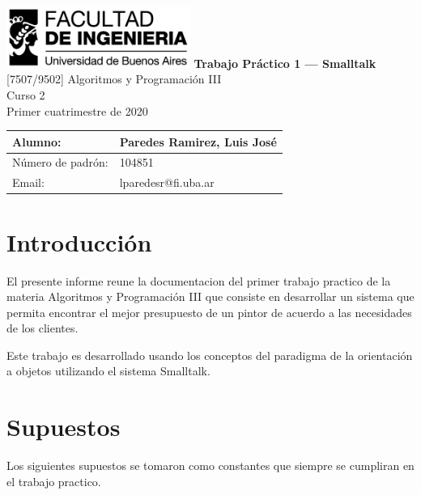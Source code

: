 \documentclass[titlepage,a4paper]{article}
\begin{document}
\begin{titlepage} %
	\hfill\includegraphics[width=6cm]{logofiuba.jpg}
    \centering
    \vfill
    \Huge \textbf{Trabajo Práctico 1 — Smalltalk}
    \vskip2cm
    \Large [7507/9502] Algoritmos y Programación III\\
    Curso 2 \\ %
    Primer cuatrimestre de 2020 
    \vfill
    \begin{tabular}{ | l | l | } %
      \hline
      Alumno: & Paredes Ramirez, Luis José\\ \hline
      Número de padrón: & 104851 \\ \hline
      Email: & lparedesr@fi.uba.ar \\ \hline
  	\end{tabular}
    \vfill
    \vfill
\end{titlepage}

\tableofcontents %
\newpage

\section{Introducción}\label{sec:intro}
  El presente informe reune la documentacion del primer trabajo practico de la materia
  Algoritmos y Programación III que consiste en desarrollar un sistema que permita encontrar el mejor 
  presupuesto de un pintor de acuerdo a las necesidades de los clientes. \newline

  Este trabajo es desarrollado usando los conceptos del paradigma de la orientación a objetos
  utilizando el sistema Smalltalk.


\section{Supuestos}\label{sec:supuestos}

Los siguientes supuestos se tomaron como constantes que siempre se cumpliran en el trabajo practico.
\end{document}
